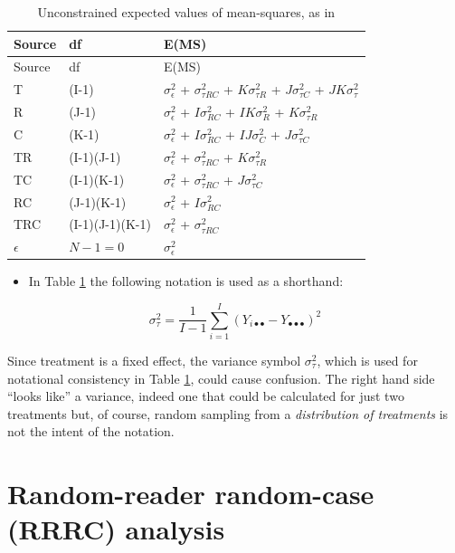\documentclass[
]{book}
\providecommand{\tightlist}{%
  \setlength{\itemsep}{0pt}\setlength{\parskip}{0pt}}
\begin{document}
\begin{longtable}[]{@{}lll@{}}
\caption{\label{tab:ExpValMs} Unconstrained expected values of mean-squares, as in \citep{RN2079}}\tabularnewline
\toprule
Source & df & E(MS)\tabularnewline
\midrule
\endfirsthead
\toprule
Source & df & E(MS)\tabularnewline
\midrule
\endhead
T & (I-1) & \(\sigma_{\epsilon}^{2}\) + \(\sigma_{\tau RC}^{2}\) + \(K\sigma_{\tau R}^{2}\) + \(J\sigma_{\tau C}^{2}\) + \(JK\sigma_{\tau}^{2}\)\tabularnewline
R & (J-1) & \(\sigma_{\epsilon}^{2}\) + \(I\sigma_{RC}^{2}\) + \(IK\sigma_{R}^{2}\) + \(K\sigma_{\tau R}^{2}\)\tabularnewline
C & (K-1) & \(\sigma_{\epsilon}^{2}\) + \(I\sigma_{RC}^{2}\) + \(IJ\sigma_{C}^{2}\) + \(J\sigma_{\tau C}^{2}\)\tabularnewline
TR & (I-1)(J-1) & \(\sigma_{\epsilon}^{2}\) + \(\sigma_{\tau RC}^{2}\) + \(K\sigma_{\tau R}^{2}\)\tabularnewline
TC & (I-1)(K-1) & \(\sigma_{\epsilon}^{2}\) + \(\sigma_{\tau RC}^{2}\) + \(J\sigma_{\tau C}^{2}\)\tabularnewline
RC & (J-1)(K-1) & \(\sigma_{\epsilon}^{2}\) + \(I\sigma_{RC}^{2}\)\tabularnewline
TRC & (I-1)(J-1)(K-1) & \(\sigma_{\epsilon}^{2}\) + \(\sigma_{\tau RC}^{2}\)\tabularnewline
\(\epsilon\) & \(N-1=0\) & \(\sigma_{\epsilon}^{2}\)\tabularnewline
\bottomrule
\end{longtable}

\begin{itemize}
\tightlist
\item
  In Table \ref{tab:ExpValMs} the following notation is used as a shorthand:
\end{itemize}

\begin{equation}
\sigma_{\tau}^{2}=\frac{1}{I-1}\sum_{i=1}^{I}\left ( Y_{i \bullet \bullet} - Y_{\bullet \bullet \bullet} \right )^2
\label{eq:defnVarTau}
\end{equation}

Since treatment is a fixed effect, the variance symbol \(\sigma_{\tau}^{2}\), which is used for notational consistency in Table \ref{tab:ExpValMs}, could cause confusion. The right hand side ``looks like'' a variance, indeed one that could be calculated for just two treatments but, of course, random sampling from a \emph{distribution of treatments} is not the intent of the notation.

\hypertarget{DBMAnalysisSigtesting-RRRC-analysis}{%
\section{Random-reader random-case (RRRC) analysis}\label{DBMAnalysisSigtesting-RRRC-analysis}}
\end{document}
